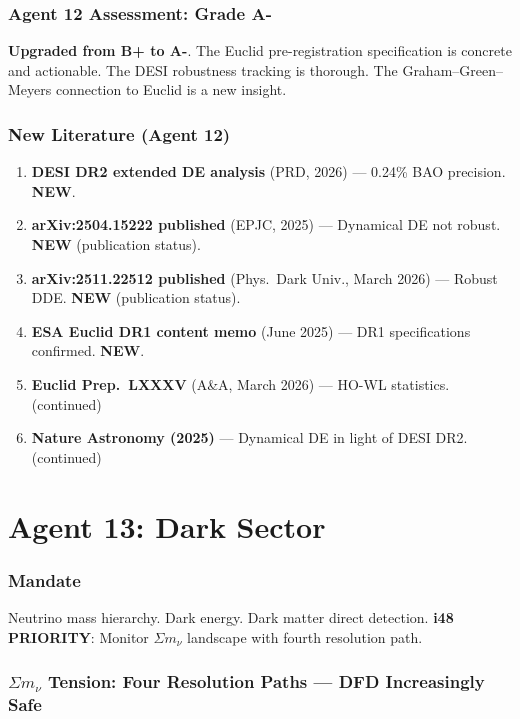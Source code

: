 \documentclass[11pt,a4paper]{article}
\newcommand{\NEW}{\textcolor{dfdblue}{\textbf{NEW}}}
\begin{document}
\section{Agent 12 Assessment: Grade A-}

\textbf{Upgraded from B+ to A-}. The Euclid pre-registration specification is concrete and actionable. The DESI robustness tracking is thorough. The Graham--Green--Meyers connection to Euclid is a new insight.

\section{New Literature (Agent 12)}

\begin{enumerate}
\item \textbf{DESI DR2 extended DE analysis} (PRD, 2026) --- 0.24\% BAO precision. \NEW.
\item \textbf{arXiv:2504.15222 published} (EPJC, 2025) --- Dynamical DE not robust. \NEW{} (publication status).
\item \textbf{arXiv:2511.22512 published} (Phys.\ Dark Univ., March 2026) --- Robust DDE. \NEW{} (publication status).
\item \textbf{ESA Euclid DR1 content memo} (June 2025) --- DR1 specifications confirmed. \NEW.
\item \textbf{Euclid Prep.\ LXXXV} (A\&A, March 2026) --- HO-WL statistics. (continued)
\item \textbf{Nature Astronomy (2025)} --- Dynamical DE in light of DESI DR2. (continued)
\end{enumerate}


\part{Agent 13: Dark Sector}
\label{part:agent13}

\section{Mandate}

Neutrino mass hierarchy. Dark energy. Dark matter direct detection. \textbf{i48 PRIORITY}: Monitor $\Sigma m_\nu$ landscape with fourth resolution path.

\section{$\Sigma m_\nu$ Tension: Four Resolution Paths --- DFD Increasingly Safe}
\end{document}
